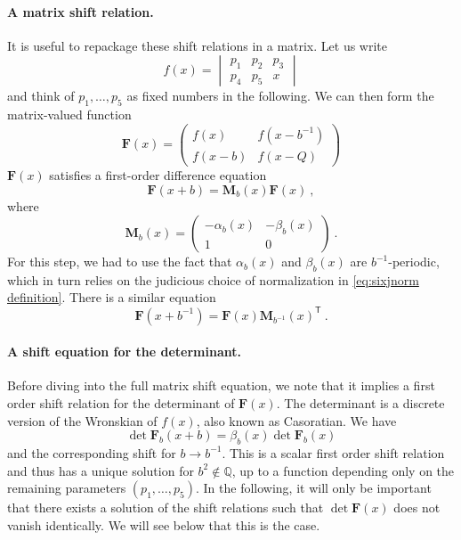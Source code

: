 \documentclass[12pt,a4paper]{article}
\newcommand{\be}{\begin{equation}}
\newcommand{\ee}{\end{equation}}
\newcommand\QQ{\mathbb{Q}}
\newcommand{\sixjnorm}[6]{\begin{vmatrix}
#1 & #2 & #3 \\
#4 & #5 & #6
\end{vmatrix}
}
\begin{document}
\paragraph{A matrix shift relation.} It is useful to repackage these shift relations in a matrix. Let us write
\be 
f(x)=\sixjnorm{p_1}{p_2}{p_3}{p_4}{p_5}{x}
\ee
and think of $p_1,\dots,p_5$ as fixed numbers in the following. We can then form the matrix-valued function
\be 
\mathbf{F}(x)=\begin{pmatrix}
    f(x) & f(x-b^{-1}) \\ f(x-b) & f(x-Q)
\end{pmatrix}
\ee
$\mathbf{F}(x)$ satisfies a first-order difference equation
\be 
\mathbf{F}(x+b)=\mathbf{M}_b(x) \mathbf{F}(x)\ , \label{eq:matrix shift relation b}
\ee
where
\be 
\mathbf{M}_b(x)=\begin{pmatrix}
    -\alpha_b(x) & -\beta_b(x) \\ 1 & 0
\end{pmatrix}\ . \label{eq:definition matrix M}
\ee
For this step, we had to use the fact that $\alpha_b(x)$ and $\beta_b(x)$ are $b^{-1}$-periodic, which in turn relies on the judicious choice of normalization in \eqref{eq:sixjnorm definition}.
There is a similar equation
\be 
\mathbf{F}(x+b^{-1})=\mathbf{F}(x) \mathbf{M}_{b^{-1}}(x)^{\mathsf{T}}\ .\label{eq:matrix shift relation b^-1}
\ee
\paragraph{A shift equation for the determinant.} Before diving into the full matrix shift equation, we note that it implies a first order shift relation for the determinant of $\mathbf{F}(x)$. The determinant is a discrete version of the Wronskian of $f(x)$, also known as Casoratian. We have
\be 
\det \mathbf{F}_b(x+b)=\beta_b(x) \det \mathbf{F}_b(x) \label{eq:difference equation determinant}
\ee
and the corresponding shift for $b \to b^{-1}$. This is a scalar first order shift relation and thus has a unique solution for $b^2 \not \in \QQ$, up to a function depending only on the remaining parameters $(p_1,\dots,p_5)$.
In the following, it will only be important that there exists a solution of the shift relations such that $\det \mathbf{F}(x)$ does not vanish identically. We will see below that this is the case.
\end{document}
